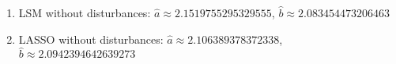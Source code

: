 \begin{enumerate}
\item LSM without disturbances:
$\hat{a}\approx 2.1519755295329555$, $\hat{b}\approx 2.083454473206463$
\item LASSO without disturbances:
$\hat{a}\approx 2.106389378372338$, $\hat{b}\approx 2.0942394642639273$
\end{enumerate}
